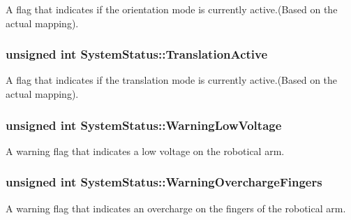 A flag that indicates if the orientation mode is currently active.(Based on the actual mapping). 

\subsubsection[{\texorpdfstring{Translation\+Active}{TranslationActive}}]{\setlength{\rightskip}{0pt plus 5cm}unsigned int System\+Status\+::\+Translation\+Active}\hypertarget{struct_system_status_a426a7b594f1aa2672e01c37c93515b1c}{}\label{struct_system_status_a426a7b594f1aa2672e01c37c93515b1c}


A flag that indicates if the translation mode is currently active.(Based on the actual mapping). 

\subsubsection[{\texorpdfstring{Warning\+Low\+Voltage}{WarningLowVoltage}}]{\setlength{\rightskip}{0pt plus 5cm}unsigned int System\+Status\+::\+Warning\+Low\+Voltage}\hypertarget{struct_system_status_a690324ff7d7b755fdaf01efda3adf044}{}\label{struct_system_status_a690324ff7d7b755fdaf01efda3adf044}


A warning flag that indicates a low voltage on the robotical arm. 

\subsubsection[{\texorpdfstring{Warning\+Overcharge\+Fingers}{WarningOverchargeFingers}}]{\setlength{\rightskip}{0pt plus 5cm}unsigned int System\+Status\+::\+Warning\+Overcharge\+Fingers}\hypertarget{struct_system_status_a055bea9394191a3e0fcaf740b78d651c}{}\label{struct_system_status_a055bea9394191a3e0fcaf740b78d651c}


A warning flag that indicates an overcharge on the fingers of the robotical arm. 

